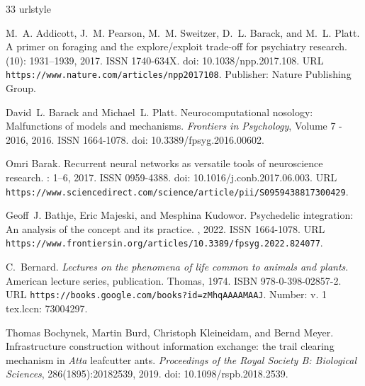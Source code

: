 \documentclass[12pt,fleqn]{article}
\begin{document}
\sloppy
\begin{thebibliography}{33}
  \providecommand{\natexlab}[1]{#1}
  \providecommand{\url}[1]{\texttt{#1}}
  \expandafter\ifx\csname urlstyle\endcsname\relax
    \providecommand{\doi}[1]{doi: #1}\else
    \providecommand{\doi}{doi: \begingroup \urlstyle{rm}\Url}\fi

  M.~A. Addicott, J.~M. Pearson, M.~M. Sweitzer, D.~L. Barack, and M.~L. Platt.
  \newblock A primer on foraging and the explore/exploit trade-off for psychiatry
  research.
   (10): 1931--1939, 2017.
  \newblock ISSN 1740-634X.
  \newblock \doi{10.1038/npp.2017.108}.
  \newblock URL \url{https://www.nature.com/articles/npp2017108}.
  \newblock Publisher: Nature Publishing Group.

  David~L. Barack and Michael~L. Platt.
  \newblock Neurocomputational nosology: {{Malfunctions}} of models and
  mechanisms.
  \newblock \emph{Frontiers in Psychology}, Volume 7 - 2016, 2016.
  \newblock ISSN 1664-1078.
  \newblock \doi{10.3389/fpsyg.2016.00602}.

  Omri Barak.
  \newblock Recurrent neural networks as versatile tools of neuroscience
  research.
  : 1--6, 2017.
  \newblock ISSN 0959-4388.
  \newblock \doi{10.1016/j.conb.2017.06.003}.
  \newblock URL
  \url{https://www.sciencedirect.com/science/article/pii/S0959438817300429}.

  Geoff~J. Bathje, Eric Majeski, and Mesphina Kudowor.
  \newblock Psychedelic integration: An analysis of the concept and its practice.
  , 2022.
  \newblock ISSN 1664-1078.
  \newblock URL
  \url{https://www.frontiersin.org/articles/10.3389/fpsyg.2022.824077}.

  C.~Bernard.
  \newblock \emph{Lectures on the phenomena of life common to animals and
    plants}.
  \newblock American lecture series, publication. Thomas, 1974.
  \newblock ISBN 978-0-398-02857-2.
  \newblock URL \url{https://books.google.com/books?id=zMhqAAAAMAAJ}.
  \newblock Number: v. 1 tex.lccn: 73004297.

  Thomas Bochynek, Martin Burd, Christoph Kleineidam, and Bernd Meyer.
  \newblock Infrastructure construction without information exchange: the trail
  clearing mechanism in \emph{Atta} leafcutter ants.
  \newblock \emph{Proceedings of the Royal Society B: Biological Sciences},
  286(1895):20182539, 2019.
  \newblock \doi{10.1098/rspb.2018.2539}.


\end{thebibliography}
\end{document}
